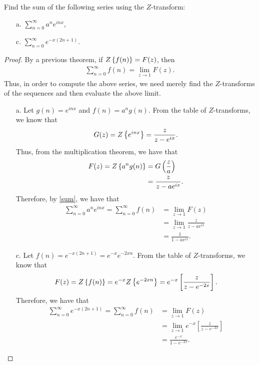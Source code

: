 \begin{problem}{12.11}
  Find the sum of the following series using the $Z$-transform:
  \begin{enumerate}
    \item[a.] $\displaystyle \sum_{n=0}^\infty a^n e^{inx}$,
    \item[c.] $\displaystyle \sum_{n=0}^\infty e^{-x(2n+1)}$.
  \end{enumerate}
\end{problem}

\begin{proof}
  By a previous theorem, if $Z\left\{ {f(n)} \right\} = F(z)$, then
  \begin{align}
    \label{sum}
    \sum_{n=0}^\infty f(n) = \lim_{z\to 1} F(z).
  \end{align}
  Thus, in order to compute the above series, we need merely find the $Z$-transforms
  of the sequences and then evaluate the above limit.

  \begin{enumerate}
    \item[a.] Let $g(n) = e^{inx}$ and $f(n) = a^n g(n)$. From the table of $Z$-transforms,
      we know that
      \begin{align*}
        G(z) = Z\left\{ {e^{inx}} \right\} = \frac{z}{z-e^{ix}}.
      \end{align*}
      Thus, from the multiplication theorem, we have that
      \begin{align*}
        F(z) = Z\left\{ {a^ng(n)} \right\} &= G\left(\frac{z}{a}\right) \\
        &= \frac{z}{z-ae^{ix}}.
      \end{align*}
      Therefore, by \eqref{sum}, we have that
      \begin{align*}
        \sum_{n=0}^\infty a^n e^{inx} = \sum_{n=0}^\infty f(n) &= \lim_{z\to 1} F(z) \\
        &= \lim_{z\to 1}\frac{z}{z-ae^{ix}} \\
        &= \frac{1}{1-ae^{ix}}.
      \end{align*}

    \item[c.] Let $f(n) = e^{-x(2n+1)} = e^{-x}e^{-2xn}$. From the table of $Z$-transforms,
      we know that
      \begin{align*}
        F(z) = Z\left\{ {f(n)} \right\} = e^{-x}Z\left\{ {e^{-2xn}} \right\} = e^{-x} \left[\frac{z}{z-e^{-2x}}\right].
      \end{align*}
      Therefore, we have that
      \begin{align*}
        \sum_{n=0}^\infty e^{-x(2n+1)} = \sum_{n=0}^{\infty} f(n) &= \lim_{z\to 1} F(z) \\
        &= \lim_{z\to 1} e^{-x} \left[\frac{z}{z-e^{-2x}}\right] \\
        &=  \frac{e^{-x}}{1-e^{-2x}}.
      \end{align*}
  \end{enumerate}
\end{proof}
\newpage
